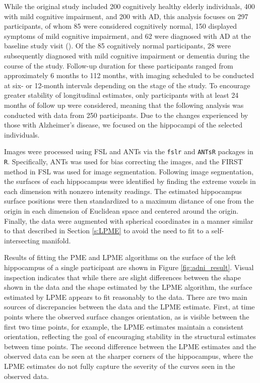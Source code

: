 \documentclass[11pt,reqno]{article}
\newcommand{\zielinski}[1]{{\color{blue} \sf $\spadesuit\spadesuit\spadesuit$ Rob Zielinski: [#1]}}
\theoremstyle{definition}
\begin{document}
While the original study included 200 cognitively healthy elderly individuals, 400 with mild cognitive impairment, and 200 with AD, this analysis focuses on 297 participants, of whom 85 were considered cognitively normal, 150 displayed symptoms of mild cognitive impairment, and 62 were diagnosed with AD at the baseline study visit (\cite{jack2008adni}). Of the 85 cognitively normal participants, 28 were subsequently diagnosed with mild cognitive impairment or dementia during the course of the study. Follow-up duration for these participants ranged from approximately 6 months to 112 months, with imaging scheduled to be conducted at six- or 12-month intervals depending on the stage of the study. To encourage greater stability of longitudinal estimates, only participants with at least 24 months of follow up were considered, meaning that the following analysis was conducted with data from 250 participants. Due to the changes experienced by those with Alzheimer's disease, we focused on the hippocampi of the selected individuals.

Images were processed using FSL and ANTs via the \texttt{fslr} and \texttt{ANTsR} packages in \texttt{R}. Specifically, ANTs was used for bias correcting the images, and the FIRST method in FSL was used for image segmentation. Following image segmentation, the surfaces of each hippocampus were identified by finding the extreme voxels in each dimension with nonzero intensity readings. The estimated hippocampus surface positions were then standardized to a maximum distance of one from the origin in each dimension of Euclidean space and centered around the origin. Finally, the data were augmented with spherical coordinates in a manner similar to that described in Section \ref{s:LPME} to avoid the need to fit to a self-intersecting manifold.


Results of fitting the PME and LPME algorithms on the surface of the left hippocampus of a single participant are shown in Figure \ref{fig:adni_result}. Visual inspection indicates that while there are slight differences between the shape shown in the data and the shape estimated by the LPME algorithm, the surface estimated by LPME appears to fit reasonably to the data. There are two main sources of discrepancies between the data and the LPME estimate. First, at time points where the observed surface changes orientation, as is visible between the first two time points, for example, the LPME estimates maintain a consistent orientation, reflecting the goal of encouraging stability in the structural estimates between time points. The second difference between the LPME estimates and the observed data can be seen at the sharper corners of the hippocampus, where the LPME estimates do not fully capture the severity of the curves seen in the observed data.
\end{document}
